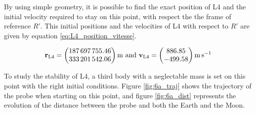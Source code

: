 \documentclass[a4paper,12pt,twoside]{article}
\begin{document}
By using simple geometry, it is possible to find the exact position of L4 and the initial velocity required to stay on this point, with respect the the frame of reference $R'$.
This initial positions and the velocities of L4 with respect to $R'$ are given by equation \eqref{eq:L4_position_vitesse}.

\begin{equation}
  \mathbf{r_\text{L4}} =
  \begin{pmatrix}
    \num{187697755.46} \\
    \num{333201542.06}
  \end{pmatrix}
  \text{\si{\m} and }
  \mathbf{v_\text{L4}} =
  \begin{pmatrix}
    \num{886.85} \\
    \num{-499.58}
  \end{pmatrix}\si{\m\per\s}
  \label{eq:L4_position_vitesse}
\end{equation}

To study the stability of L4, a third body with a neglectable mass is set on this point with the right initial conditions.
Figure \ref{fig:6a_traj} shows the trajectory of the probe when starting on this point, and figure \ref{fig:6a_dist} represents the evolution of the distance between the probe and both the Earth and the Moon.
\end{document}
